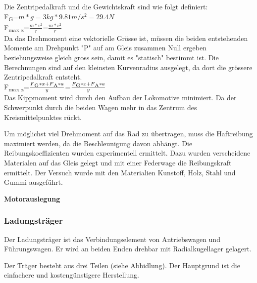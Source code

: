 \documentclass[../../main.tex]{subfiles}
\begin{document}
        Die Zentripedalkraft und die Gewichtskraft sind wie folgt definiert:\\
    
    F\textsubscript{G}=\(m*g=3kg*9.81m/s^2=29.4N\)\\

    F\textsubscript{max z}=\(\frac{m*v^2}{r}\)=\(\frac{m*v^2}{r}\)\\
    
    Da das Drehmoment eine vektorielle Grösse ist, müssen die beiden entstehenden Momente am Drehpunkt "P" auf am Gleis zusammen Null ergeben beziehungsweise gleich gross sein, damit es "statisch" bestimmt ist. Die Berechnungen sind auf den kleinsten Kurvenradius ausgelegt, da dort die grössere Zentripedalkraft entsteht.\\

    F\textsubscript{max z}=\(\frac{F\textsubscript{G}*x+F\textsubscript{A}*a}{y}\)=\(\frac{F\textsubscript{G}*x+F\textsubscript{A}*a}{y}\)\\

    
    Das Kippmoment wird durch den Aufbau der Lokomotive minimiert. Da der Schwerpunkt durch die beiden Wagen mehr in das Zentrum des Kreismittelpunktes rückt.
    
    Um möglichst viel Drehmoment auf das Rad zu übertragen, muss die Haftreibung maximiert werden, da die Beschleunigung davon abhängt. Die Reibungskoeffizienten wurden experimentell ermittelt. Dazu wurden verscheidene Materialen auf das Gleis gelegt und mit einer Federwage die Reibungskraft ermittelt. Der Versuch wurde mit den Materialien Kunstoff, Holz, Stahl und Gummi ausgeführt.

    \textbf{Motorauslegung}\\

    \subsubsection{Ladungsträger}
    Der Ladungsträger ist das Verbindungselement von Antriebswagen und Führungswagen. Er wird an beiden Enden drehbar mit Radialkugellager gelagert.

    Der Träger besteht aus drei Teilen (siehe Abbidlung). Der Hauptgrund ist die einfachere und kostengünstigere Herstellung.

\end{document}
